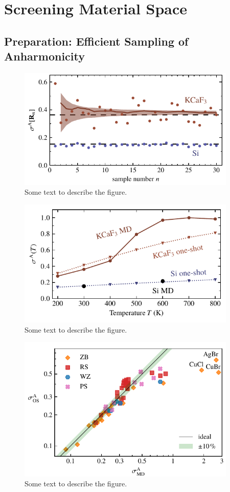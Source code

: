 \section{Screening Material Space}

\subsection{Preparation: Efficient Sampling of Anharmonicity}

\begin{figure}
	\includegraphics[width=4.1in]{./plots/anharmonicity/7_sampling/convergence_sigma_MC.pdf}
	\caption{
		Some text to describe the figure.
	}
\end{figure}

\begin{figure}
	\includegraphics[width=4.1in]{./plots/anharmonicity/7_sampling/sigma_temp_one_shot.pdf}
	\caption{
		Some text to describe the figure.
	}
\end{figure}

\begin{figure}
	\includegraphics[width=4.1in]{./plots/anharmonicity/8_screening/sigma_os_md.pdf}
	\caption{
		Some text to describe the figure.
	}
\end{figure}

